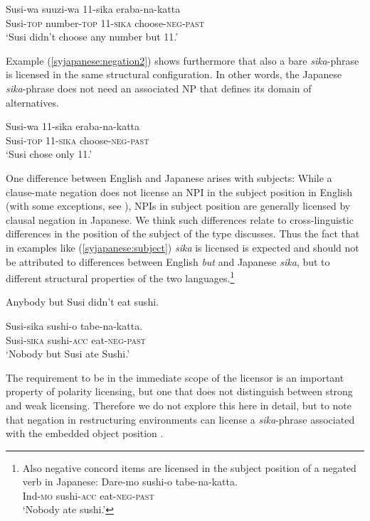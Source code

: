 \documentclass[output=paper,colorlinks,citecolor=brown,
]{langscibook}
\def\M#1{\textsc{#1}}
\begin{document}
\ea \label{syjapanese:negation1}
\gll Susi-wa suuzi-wa 11-sika eraba-na-katta\\
     Susi-\M{top} number-\M{top} 11-\M{sika} choose-\M{neg}-\M{past}\\
\glt `Susi didn't choose any number but 11.'\z

Example (\ref{syjapanese:negation2}) shows furthermore that also a bare \emph{sika}-phrase is licensed in the same structural configuration. In other words, the Japanese \emph{sika}-phrase does not need an associated NP that defines its domain of alternatives.

\ea \label{syjapanese:negation2}
\gll Susi-wa 11-sika eraba-na-katta\\
     Susi-\textsc{top} 11-\textsc{sika} choose-\M{neg}-\textsc{past}\\
\glt `Susi chose only 11.'\z


One difference between English and Japanese arises with subjects:
While a clause-mate negation does not license an NPI in the subject position in English (with some exceptions, see \citealt{uribe95a}), NPIs in subject position are generally licensed by clausal negation in Japanese.
We think such differences relate to cross-linguistic differences in the position of the subject of the type \cite{wurmbrand06a} discusses.
Thus the fact that in examples like (\ref{syjapanese:subject}) \emph{sika} is licensed is expected and should not be attributed to differences between English \emph{but} and Japanese \emph{sika}, but to different structural properties of the two languages.\footnote{Also negative concord items are licensed in the subject position of a negated verb in Japanese:
\ea \label{syNegQ-1}
\gll Dare-mo sushi-o tabe-na-katta.\\
Ind-\M{mo} sushi-\M{acc} eat-\M{neg}-\M{past}\\
\glt `Nobody ate sushi.'\z}

\ea *Anybody but Susi didn't eat sushi.\z

\ea \label{syjapanese:subject}
\gll Susi-sika sushi-o tabe-na-katta.\\
Susi-\M{sika} sushi-\M{acc} eat-\M{neg-past}\\
\glt `Nobody but Susi ate Sushi.'\z


The requirement to be in the immediate scope of the licensor is an important property of polarity licensing, but one that does not distinguish between strong and weak licensing.
Therefore we do not explore this here in detail, but to note that negation in restructuring environments \citep{wurmbrand01b} can license a  \emph{sika}-phrase associated with the embedded object position \citep{muraki78}.
\end{document}

